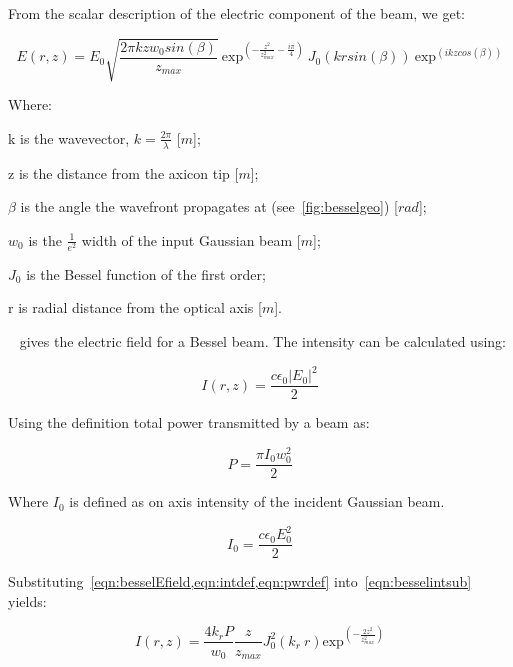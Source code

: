From the scalar description of the electric component of the beam, we get:

\begin{equation}
    E(r,z)=E_0\sqrt{\frac{2\pi k z w_0sin(\beta)}{z_{max}}}\ \text{exp}^{\left(-\frac{z^2}{z_{max}^2}-\frac{i\pi}{4}\right)}\ J_0\left(krsin(\beta)\right)\ \text{exp}^{\left(ikzcos(\beta)\right)}
    \label{eqn:besselEfield}
\end{equation}

\noindent Where:

    \indent k is the wavevector, $k=\tfrac{2\pi}{\lambda}$ [$m$];

    \indent z is the distance from the axicon tip [$m$]; 

    \indent $\beta$ is the angle the wavefront propagates at (see~\cref{fig:besselgeo}) [$rad$]; 

    \indent $w_0$ is the $\tfrac{1}{e^2}$ width of the input Gaussian beam [$m$]; 

    \indent $J_0$ is the Bessel function of the first order; 

    \indent r is radial distance from the optical axis [$m$]. 

\medskip


~ gives the electric field for a Bessel beam. The intensity can be calculated using:

\begin{equation}
    I(r,z)=\frac{c\epsilon_0\left|E_0\right|^2}{2}
    \label{eqn:besselintsub}
\end{equation}

Using the definition total power transmitted by a beam as:

\begin{equation}
    P=\frac{\pi I_0w_0^2}{2}
    \label{eqn:pwrdef}
\end{equation}

Where $I_0$ is defined as on axis intensity of the incident Gaussian beam.

\begin{equation}
    I_0=\frac{c\epsilon_0E_0^2}{2}
    \label{eqn:intdef}
\end{equation}

Substituting~\cref{eqn:besselEfield,eqn:intdef,eqn:pwrdef} into~\cref{eqn:besselintsub} yields:

\begin{equation}
    I(r,z)=\frac{4k_rP}{w_0}\frac{z}{z_{max}}J_0^2\left(k_r\ r\right)\text{exp}^{\left(-\frac{2z^2}{z^2_{max}}\right)}
    \label{eqn:besselInt}
\end{equation}



